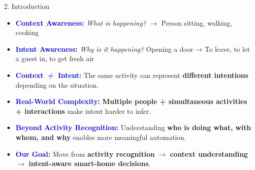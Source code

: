 \documentclass[aspectratio=169,11pt,xcolor=table]{beamer}
\begin{document}

\begin{frame}{2. Introduction}

\begin{itemize}
    \setlength{\itemsep}{0.5em}

    \item \textcolor{blue}{\textbf{Context Awareness:}}
    \textit{What is happening?}
    $\rightarrow$ Person sitting, walking, cooking

    \item \textcolor{blue}{\textbf{Intent Awareness:}}
    \textit{Why is it happening?}
     Opening a door → To leave, to let a guest in, to get fresh air

    \item \textcolor{blue}{\textbf{Context $\neq$ Intent:}}
    The same activity can represent \textbf{different intentions}
    depending on the situation.

    \item \textcolor{blue}{\textbf{Real-World Complexity:}}
    \textbf{Multiple people + simultaneous activities + interactions}
    make intent harder to infer.

    \item \textcolor{blue}{\textbf{Beyond Activity Recognition:}}
    Understanding \textbf{who is doing what, with whom, and why}
    enables more meaningful automation.

    \item \textcolor{blue}{\textbf{Our Goal:}}
    Move from \textbf{activity recognition}
    $\rightarrow$ \textbf{context understanding}
    $\rightarrow$ \textbf{intent-aware smart-home decisions}.
\end{itemize}

\end{frame}
\end{document}

